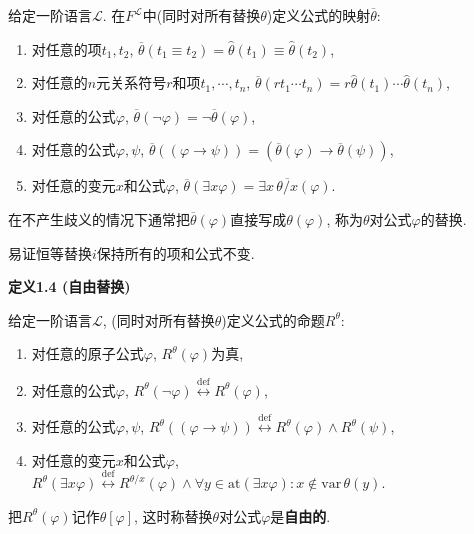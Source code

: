 给定一阶语言$\mathcal{L}$.
在$F^{\mathcal{L}}$中(同时对所有替换$\theta$)定义公式的映射$\overline{\theta}$:
\begin{enumerate}
    \item 对任意的项$t_1,t_2$,
    $\overline{\theta}(t_1\equiv t_2)=\widehat{\theta}(t_1)\equiv
    \widehat{\theta}(t_2)$,
    \item 对任意的$n$元关系符号$r$和项$t_1,\cdots,t_n$,
    $\overline{\theta}(rt_1\cdots t_n)=r \widehat{\theta}(t_1)\cdots
    \widehat{\theta}(t_n)$,
    \item 对任意的公式$\varphi$,
    $\overline{\theta}(\neg\varphi)=\neg \overline{\theta}(\varphi)$,
    \item 对任意的公式$\varphi,\psi$, $\overline{\theta}((\varphi\to\psi))
    =(\overline{\theta}(\varphi)\to \overline{\theta}(\psi))$,
    \item 对任意的变元$x$和公式$\varphi$,
    $\overline{\theta}(\exists x\varphi)=\exists x\,\overline{\theta/x}(\varphi)$.
\end{enumerate}
在不产生歧义的情况下通常把$\overline{\theta}(\varphi)$直接写成$\theta(\varphi)$,
称为$\theta$对公式$\varphi$的替换.

\vspace{10pt}

易证恒等替换$i$保持所有的项和公式不变.

\vspace{10pt}

\hypertarget{sec:定义1.4}{}
\noindent\textbf{定义1.4 (自由替换)}

给定一阶语言$\mathcal{L}$, (同时对所有替换$\theta$)定义公式的命题$R^\theta$:
\begin{enumerate}
    \item 对任意的原子公式$\varphi$, $R^\theta(\varphi)$为真,
    \vspace{3pt}
    \item 对任意的公式$\varphi$,
    $R^\theta(\neg\varphi)\overset{\mathrm{def}}{\leftrightarrow}R^\theta(\varphi)$,
    \vspace{3pt}
    \item 对任意的公式$\varphi,\psi$,
    $R^\theta((\varphi\to\psi))\overset{\mathrm{def}}{\leftrightarrow}
    R^\theta(\varphi)\land R^\theta(\psi)$,
    \vspace{3pt}
    \item 对任意的变元$x$和公式$\varphi$,
    $R^\theta(\exists x\varphi)\overset{\mathrm{def}}{\leftrightarrow}
    R^{\theta/x}(\varphi)
    \land\forall y\in\mathrm{at}(\exists x\varphi):x\notin\mathrm{var}\,\theta(y)$.
\end{enumerate}
把$R^\theta(\varphi)$记作$\theta[\varphi]$,
这时称替换$\theta$对公式$\varphi$是\textbf{自由的}.

